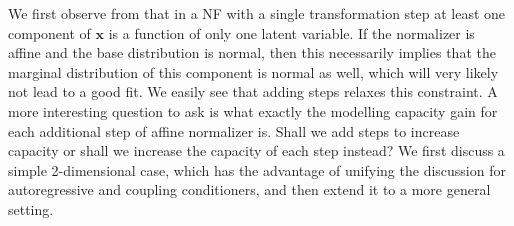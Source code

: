 We first observe from  that in a NF with a single transformation step at least one component of $\mathbf{x}$ is a function of only one latent variable.
If the normalizer is affine and the base distribution is normal, then this necessarily implies that the marginal distribution of this component is normal as well, which will very likely not lead to a good fit.
We easily see that adding steps relaxes this constraint.
A more interesting question to ask is what exactly the modelling capacity gain for each additional step of affine normalizer is. Shall we add steps to increase capacity or shall we increase the capacity of each step instead?
We first discuss a simple 2-dimensional case, which has the advantage of unifying the discussion for autoregressive and coupling conditioners, and then extend it to a more general setting.


